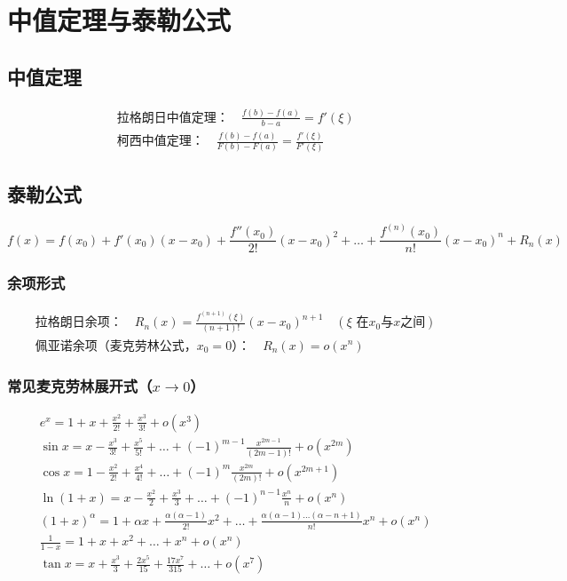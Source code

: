 \documentclass{article}
\begin{document}
\section{中值定理与泰勒公式}
\subsection{中值定理}
\[
\begin{aligned}
&\text{拉格朗日中值定理：} \quad \frac{f(b)-f(a)}{b-a} = f'(\xi) \\
&\text{柯西中值定理：} \quad \frac{f(b)-f(a)}{F(b)-F(a)} = \frac{f'(\xi)}{F'(\xi)}
\end{aligned}
\]

\subsection{泰勒公式}
\[
f(x) = f(x_0) + f'(x_0)(x-x_0) + \frac{f''(x_0)}{2!}(x-x_0)^2 + \dots + \frac{f^{(n)}(x_0)}{n!}(x-x_0)^n + R_n(x)
\]
\subsubsection{余项形式}
\[
\begin{aligned}
&\text{拉格朗日余项：} \quad R_n(x) = \frac{f^{(n+1)}(\xi)}{(n+1)!}(x-x_0)^{n+1} \quad (\xi \text{ 在} x_0 \text{与} x \text{之间}) \\
&\text{佩亚诺余项（麦克劳林公式，} x_0=0\text{）：} \quad R_n(x) = o(x^n)
\end{aligned}
\]

\subsubsection{常见麦克劳林展开式（$x \to 0$）}
\[
\begin{aligned}
&e^x = 1 + x + \frac{x^2}{2!} + \frac{x^3}{3!} + o(x^3) \\
&\sin x = x - \frac{x^3}{3!} + \frac{x^5}{5!} + \dots + (-1)^{m-1}\frac{x^{2m-1}}{(2m-1)!} + o(x^{2m}) \\
&\cos x = 1 - \frac{x^2}{2!} + \frac{x^4}{4!} + \dots + (-1)^m\frac{x^{2m}}{(2m)!} + o(x^{2m+1}) \\
&\ln(1+x) = x - \frac{x^2}{2} + \frac{x^3}{3} + \dots + (-1)^{n-1}\frac{x^n}{n} + o(x^n) \\
&(1+x)^\alpha = 1 + \alpha x + \frac{\alpha(\alpha-1)}{2!}x^2 + \dots + \frac{\alpha(\alpha-1)\dots(\alpha-n+1)}{n!}x^n + o(x^n) \\
&\frac{1}{1-x} = 1 + x + x^2 + \dots + x^n + o(x^n) \\
&\tan x = x + \frac{x^3}{3} + \frac{2x^5}{15} + \frac{17x^7}{315} + \dots + o(x^7)
\end{aligned}
\]
\end{document}
